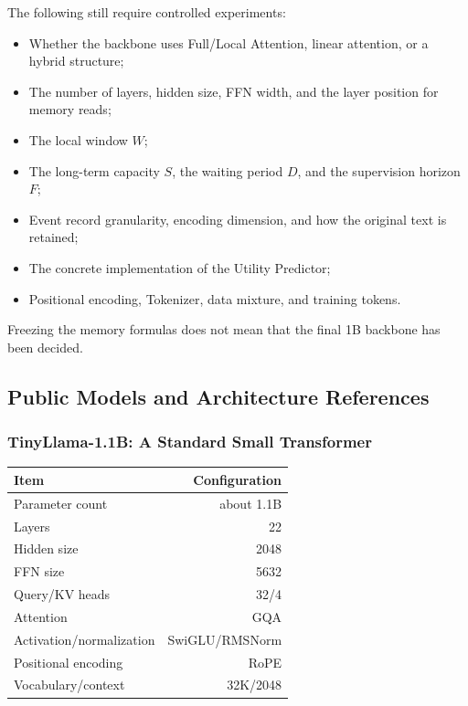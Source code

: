 The following still require controlled experiments:

\begin{itemize}
  \item Whether the backbone uses Full/Local Attention, linear attention, or a hybrid structure;
  \item The number of layers, hidden size, FFN width, and the layer position for memory reads;
  \item The local window $W$;
  \item The long-term capacity $S$, the waiting period $D$, and the supervision horizon $F$;
  \item Event record granularity, encoding dimension, and how the original text is retained;
  \item The concrete implementation of the Utility Predictor;
  \item Positional encoding, Tokenizer, data mixture, and training tokens.
\end{itemize}

Freezing the memory formulas does not mean that the final 1B backbone has been decided.

\subsection{Public Models and Architecture References}

\subsubsection{TinyLlama-1.1B: A Standard Small Transformer}

\begin{table}[htbp]\centering
\begin{tabular}{lr}\toprule
Item & Configuration\\
\midrule
Parameter count & about 1.1B\\
Layers & 22\\
Hidden size & 2048\\
FFN size & 5632\\
Query/KV heads & 32/4\\
Attention & GQA\\
Activation/normalization & SwiGLU/RMSNorm\\
Positional encoding & RoPE\\
Vocabulary/context & 32K/2048\\
\bottomrule
\end{tabular}
\end{table}

